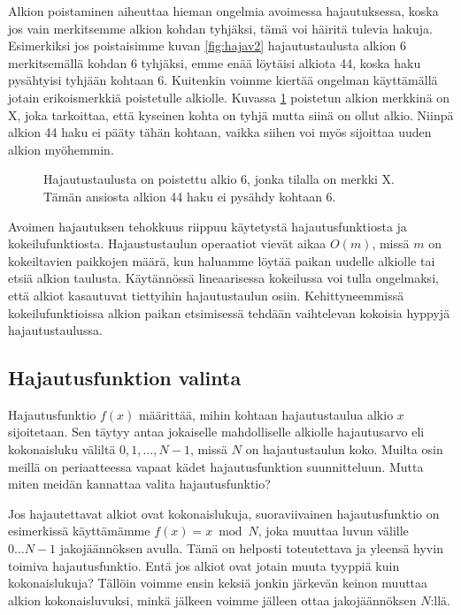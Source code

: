Alkion poistaminen aiheuttaa hieman ongelmia avoimessa hajautuksessa,
koska jos vain merkitsemme alkion kohdan tyhjäksi, tämä voi häiritä tulevia hakuja.
Esimerkiksi jos poistaisimme kuvan \ref{fig:hajav2} hajautustaulusta alkion 6
merkitsemällä kohdan 6 tyhjäksi, emme enää löytäisi alkiota 44,
koska haku pysähtyisi tyhjään kohtaan 6.
Kuitenkin voimme kiertää ongelman käyttämällä jotain erikoismerkkiä
poistetulle alkiolle. Kuvassa \ref{fig:hajav3} poistetun alkion merkkinä on X,
joka tarkoittaa, että kyseinen kohta on tyhjä mutta siinä on ollut alkio.
Niinpä alkion 44 haku ei pääty tähän kohtaan,
vaikka siihen voi myös sijoittaa uuden alkion myöhemmin.

\begin{figure}
\center
{}
\caption{Hajautustaulusta on poistettu alkio 6, jonka tilalla on merkki X.
Tämän ansiosta alkion 44 haku ei pysähdy kohtaan 6.}
\label{fig:hajav3}
\end{figure}

Avoimen hajautuksen tehokkuus riippuu käytetystä hajautusfunktiosta
ja kokeilufunktiosta.
Hajaustustaulun operaatiot vievät aikaa $O(m)$,
missä $m$ on kokeiltavien paikkojen määrä,
kun haluamme löytää paikan uudelle alkiolle
tai etsiä alkion taulusta.
Käytännössä lineaarisessa kokeilussa voi tulla ongelmaksi,
että alkiot kasautuvat tiettyihin hajautustaulun osiin.
Kehittyneemmissä kokeilufunktioissa alkion paikan etsimisessä
tehdään vaihtelevan kokoisia hyppyjä hajautustaulussa.

\subsection{Hajautusfunktion valinta}

Hajautusfunktio $f(x)$ määrittää, mihin kohtaan hajautustaulua
alkio $x$ sijoitetaan.
Sen täytyy antaa jokaiselle mahdolliselle alkiolle
hajautusarvo eli kokonaisluku väliltä $0,1,\dots,N-1$,
missä $N$ on hajautustaulun koko.
Muilta osin meillä on periaatteessa vapaat kädet
hajautusfunktion suunnitteluun.
Mutta miten meidän kannattaa valita hajautusfunktio?

Jos hajautettavat alkiot ovat kokonaislukuja,
suoraviivainen hajautusfunktio on esimerkissä käyttämämme $f(x)=x \bmod N$,
joka muuttaa luvun välille $0 \dots N-1$ jakojäännöksen avulla.
Tämä on helposti toteutettava ja yleensä hyvin toimiva hajautusfunktio.
Entä jos alkiot ovat jotain muuta tyyppiä kuin kokonaislukuja?
Tällöin voimme ensin keksiä jonkin järkevän keinon
muuttaa alkion kokonaisluvuksi,
minkä jälkeen voimme jälleen ottaa jakojäännöksen $N$:llä.

